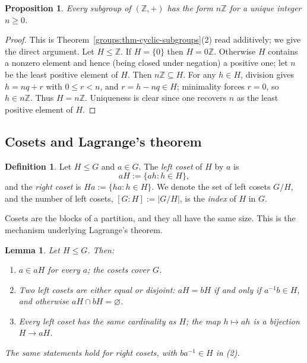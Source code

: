 \documentclass[11pt,a4paper]{article}
\newtheorem{lemma}[theorem]{Lemma}
\newtheorem{proposition}[theorem]{Proposition}
\theoremstyle{definition}
\newtheorem{definition}[theorem]{Definition}
\theoremstyle{remark}
\newcommand{\Z}{\ensuremath{\mathbb{Z}}}
\begin{document}
\begin{proposition}\label{groups:prop-subgroups-of-Z}
Every subgroup of \((\Z,+)\) has the form \(n\Z\) for a unique integer \(n \ge 0\).
\end{proposition}

\begin{proof}
This is Theorem~\ref{groups:thm-cyclic-subgroups}(2) read additively; we give the direct argument. Let \(H \le \Z\). If \(H = \{0\}\) then \(H = 0\Z\). Otherwise \(H\) contains a nonzero element and hence (being closed under negation) a positive one; let \(n\) be the least positive element of \(H\). Then \(n\Z \subseteq H\). For any \(h \in H\), division gives \(h = nq + r\) with \(0 \le r < n\), and \(r = h - nq \in H\); minimality forces \(r = 0\), so \(h \in n\Z\). Thus \(H = n\Z\). Uniqueness is clear since one recovers \(n\) as the least positive element of \(H\).
\end{proof}

\subsection{Cosets and Lagrange's theorem}

\begin{definition}\label{groups:def-coset}
Let \(H \le G\) and \(a \in G\). The \emph{left coset} of \(H\) by \(a\) is
\[
aH := \{ ah : h \in H \},
\]
and the \emph{right coset} is \(Ha := \{ha : h \in H\}\). We denote the set of left cosets \(G/H\), and the number of left cosets, \([G : H] := |G/H|\), is the \emph{index} of \(H\) in \(G\).
\end{definition}

Cosets are the blocks of a partition, and they all have the same size. This is the mechanism underlying Lagrange's theorem.

\begin{lemma}\label{groups:lem-cosets-partition}
Let \(H \le G\). Then:
\begin{enumerate}
\item \(a \in aH\) for every \(a\); the cosets cover \(G\).
\item Two left cosets are either equal or disjoint: \(aH = bH\) if and only if \(a^{-1} b \in H\), and otherwise \(aH \cap bH = \varnothing\).
\item Every left coset has the same cardinality as \(H\); the map \(h \mapsto ah\) is a bijection \(H \to aH\).
\end{enumerate}
The same statements hold for right cosets, with \(b a^{-1} \in H\) in (2).
\end{lemma}
\end{document}
